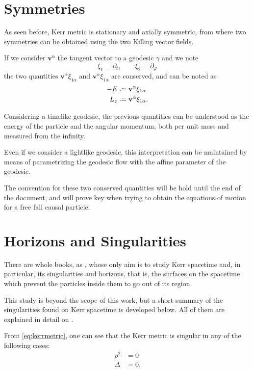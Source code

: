 \section{Symmetries}

As seen before, Kerr metric is stationary and axially symmetric, from where two symmetries can be obtained using the two Killing vector fields.

If we consider $\mathbf{v}^\alpha$ the tangent vector to a geodesic $\gamma$ and we note
\[
	\xi_1 = \partial_t, \qquad \xi_2 = \partial_\varphi
\]
the two quantities $\mathbf{v}^\alpha \xi_{1\alpha}$ and $\mathbf{v}^\alpha \xi_{1\alpha}$ are conserved, and can be noted as
\begin{align}
	\label{eq:energy}
	-E &\defeq \mathbf{v}^\alpha \xi_{1\alpha} \\
	L_z &\defeq \mathbf{v}^\alpha \xi_{1\alpha}.
\end{align}

Considering a timelike geodesic, the previous quantities can be understood as the energy of the particle and the angular momentum, both per unit mass and measured from the infinity.

Even if we consider a lightlike geodesic, this interpretation can be maintained by means of parametrizing the geodesic flow with the affine parameter of the geodesic.

The convention for these two conserved quantities will be hold until the end of the document, and will prove key when trying to obtain the equations of motion for a free fall causal particle.


\section{Horizons and Singularities}

There are whole books, as \cite{oneill95}, whose only aim is to study Kerr spacetime and, in particular, its singularities and horizons, that is, the surfaces on the spacetime which prevent the particles inside them to go out of its region.

This study is beyond the scope of this work, but a short summary of the singularities found on Kerr spacetime is developed below. All of them are explained in detail on \cite[Sec. 2.4]{galindo14}.

From \autoref{eq:kerrmetric}, one can see that the Kerr metric is singular in any of the following cases:
\begin{align}
	\rho^2 &= 0 \\
	\Delta &= 0.
\end{align}


